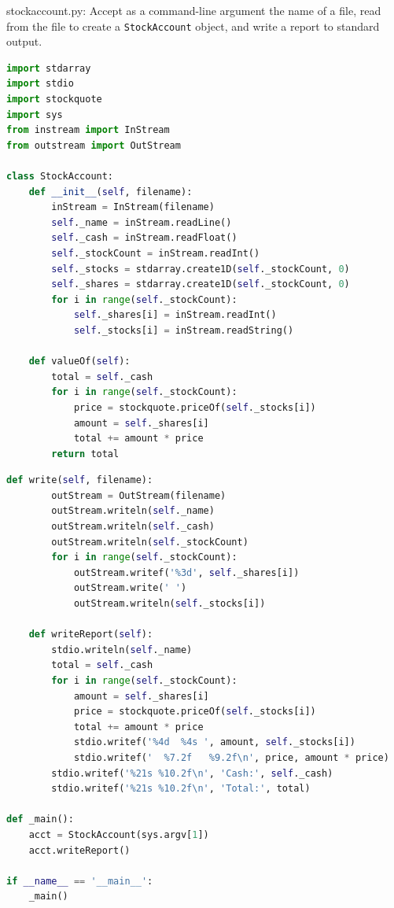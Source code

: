 \documentclass[8pt,a4paper,compress]{beamer}
\begin{document}
\begin{frame}[fragile]
\pause

\begin{framed}
\tiny stockaccount.py: Accept as a command-line argument the name of a file, read from the file to create a \lstinline{StockAccount} object, and write a report to standard output.
\end{framed}

\begin{lstlisting}[language=Python]
import stdarray
import stdio
import stockquote
import sys
from instream import InStream
from outstream import OutStream

class StockAccount:
    def __init__(self, filename):
        inStream = InStream(filename)
        self._name = inStream.readLine()
        self._cash = inStream.readFloat()
        self._stockCount = inStream.readInt()
        self._stocks = stdarray.create1D(self._stockCount, 0)
        self._shares = stdarray.create1D(self._stockCount, 0)
        for i in range(self._stockCount):
            self._shares[i] = inStream.readInt()
            self._stocks[i] = inStream.readString()

    def valueOf(self):
        total = self._cash
        for i in range(self._stockCount):
            price = stockquote.priceOf(self._stocks[i])
            amount = self._shares[i]
            total += amount * price
        return total
\end{lstlisting}
\end{frame}

\begin{frame}[fragile]
\pause

\begin{lstlisting}[language=Python]
    def write(self, filename):
        outStream = OutStream(filename)
        outStream.writeln(self._name)
        outStream.writeln(self._cash)
        outStream.writeln(self._stockCount)
        for i in range(self._stockCount):
            outStream.writef('%3d', self._shares[i])
            outStream.write(' ')
            outStream.writeln(self._stocks[i])

    def writeReport(self):
        stdio.writeln(self._name)
        total = self._cash
        for i in range(self._stockCount):
            amount = self._shares[i]
            price = stockquote.priceOf(self._stocks[i])
            total += amount * price
            stdio.writef('%4d  %4s ', amount, self._stocks[i])
            stdio.writef('  %7.2f   %9.2f\n', price, amount * price)
        stdio.writef('%21s %10.2f\n', 'Cash:', self._cash)
        stdio.writef('%21s %10.2f\n', 'Total:', total)

def _main():
    acct = StockAccount(sys.argv[1])
    acct.writeReport()

if __name__ == '__main__':
    _main()
\end{lstlisting}
\end{frame}
\end{document}
